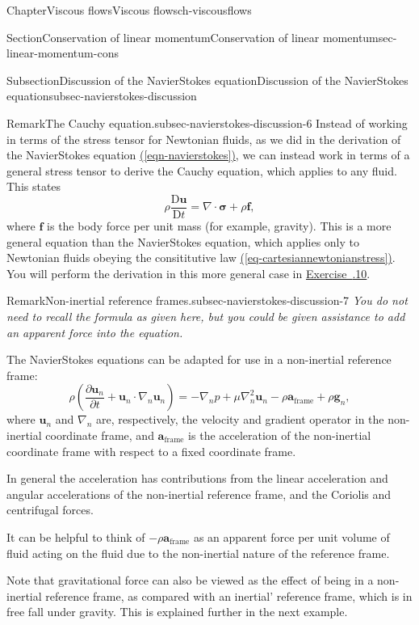 \documentclass[oneside,10pt,]{book}
\newcommand{\xreffont}{\relax}
\numberwithin{equation}{section}
\newcommand{\DD}[2]{\frac{\mathrm{D}#1}{\mathrm{D}#2}}
\newcommand{\pd}[2]{\frac{\partial#1}{\partial#2}}
\newcommand{\bu}{\boldsymbol{u}}
\newcommand{\ba}{\boldsymbol{a}}
\renewcommand{\bf}{\boldsymbol{f}}
\newcommand{\bg}{\boldsymbol{g}}
\newcommand{\bsigma}{\boldsymbol{\sigma}}
\begin{document}
\begin{chapterptx}{Chapter}{Viscous flows}{}{Viscous flows}{}{}{ch-viscousflows}
\begin{sectionptx}{Section}{Conservation of linear momentum}{}{Conservation of linear momentum}{}{}{sec-linear-momentum-cons}
\begin{subsectionptx}{Subsection}{Discussion of the Navier\textendash{}Stokes equation}{}{Discussion of the Navier\textendash{}Stokes equation}{}{}{subsec-navierstokes-discussion}
\begin{remark}{Remark}{The Cauchy equation.}{subsec-navierstokes-discussion-6}%
Instead of working in terms of the stress tensor for Newtonian fluids, as we did in the derivation of the Navier\textendash{}Stokes equation \hyperref[eqn-navierstokes]{({\xreffont\ref{eqn-navierstokes}})}, we can instead work in terms of a general stress tensor to derive the Cauchy equation, which applies to any fluid. This states%
\begin{equation}
\rho\DD{\bu}{t}=\nabla\cdot\bsigma+\rho\bf,\label{eqn-cauchy-equation}
\end{equation}
where \(\bf\) is the body force per unit mass (for example, gravity). This is a more general equation than the Navier\textendash{}Stokes equation, which applies only to Newtonian fluids obeying the consititutive law \hyperref[eq-cartesiannewtonianstress]{({\xreffont\ref{eq-cartesiannewtonianstress}})}. You will perform the derivation in this more general case in \hyperlink{ps-Cauchy-equation}{Exercise~{\xreffont 6.9.10}}.%
\end{remark}
\begin{remark}{Remark}{Non-inertial reference frames.}{subsec-navierstokes-discussion-7}%
\emph{You do not need to recall the formula as given here, but you could be given assistance to add an apparent force into the equation.}%
\par
The Navier\textendash{}Stokes equations can be adapted for use in a non-inertial reference frame:%
\begin{equation*}
\rho\left(\pd{\bu_n}{t}+\bu_n\cdot\nabla_n\bu_n\right)
=-\nabla_n p+\mu\nabla_n^2\bu_n-\rho\ba_{\textrm{frame}}+\rho\bg_n,
\end{equation*}
where \(\bu_n\) and \(\nabla_n\) are, respectively, the velocity and gradient operator in the non-inertial coordinate frame, and \(\ba_{\textrm{frame}}\) is the acceleration of the non-inertial coordinate frame with respect to a fixed coordinate frame.%
\par
In general the acceleration has contributions from the linear acceleration and angular accelerations of the non-inertial reference frame, and the Coriolis and centrifugal forces.%
\par
It can be helpful to think of \(-\rho\ba_{\textrm{frame}}\) as an apparent force per unit volume of fluid acting on the fluid due to the non-inertial nature of the reference frame.%
\par
Note that gravitational force can also be viewed as the effect of being in a non-inertial reference frame, as compared with an \textasciigrave{}inertial' reference frame, which is in free fall under gravity. This is explained further in the next example.%

\end{remark}
\end{subsectionptx}
\end{sectionptx}
\end{chapterptx}
\end{document}
